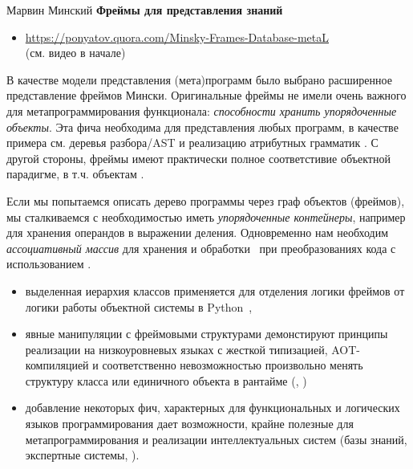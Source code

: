 \label{frame}\secdown

\clearpage
\cite{minsky} Марвин Минский \textbf{Фреймы для представления знаний}

\begin{itemize}
  \item 
\url{https://ponyatov.quora.com/Minsky-Frames-Database-metaL}\\(см. видео в
начале)
\end{itemize}


В качестве модели представления (мета)программ было выбрано расширенное
представление фреймов Мински. Оригинальные фреймы не имели очень важного для
метапрограммирования функционала: \textit{способности хранить упорядоченные
объекты}. Эта фича необходима для представления любых
программ, в качестве примера см. деревья разбора/AST и реализацию атрибутных
грамматик \cite{dragon2}. С другой стороны, фреймы имеют практически полное
соответстивие объектной парадигме, в т.ч. объектам \py.

Если мы попытаемся описать дерево программы через граф объектов (фреймов), мы
сталкиваемся с необходимостью иметь \emph{упорядоченные контейнеры}, например
для хранения операндов в выражении деления. Одновременно нам необходим
\emph{ассоциативный массив} для хранения и обработки \ при
преобразованиях кода с использованием .

\clearpage
\begin{itemize}
  \item 
выделенная иерархия классов применяется для отделения логики фреймов от логики
работы объектной системы в Python\ ,
  \item 
явные манипуляции с фреймовыми структурами демонстируют принципы реализации на
низкоуровневых языках с жесткой типизацией, AOT-компиляцией и соответственно
невозможностью произвольно менять структуру класса или единичного объекта в
рантайме (\cpp, \java)
  \item 
добавление некоторых фич, характерных для функциональных и логических языков 
программирования 
дает возможности, крайне полезные для метапрограммирования и реализации
интеллектуальных систем (базы знаний, экспертные системы, ).
\end{itemize}

